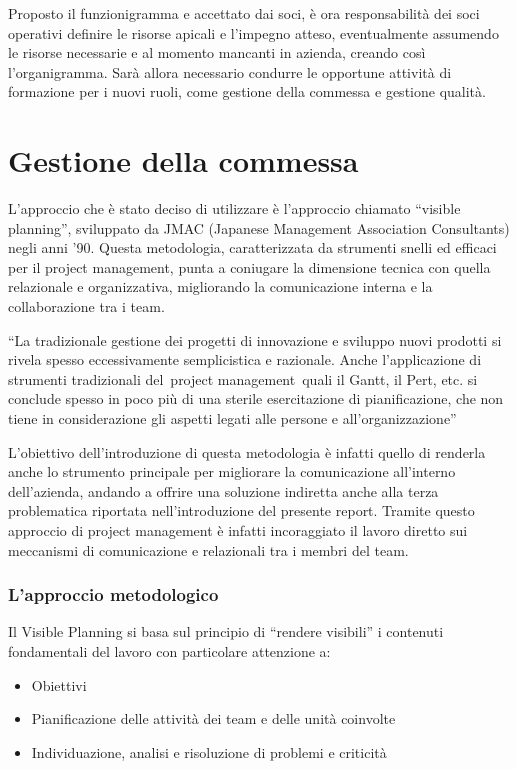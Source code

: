 \begin{multicols}{2}
	Proposto il funzionigramma e accettato dai soci, è ora responsabilità dei soci operativi definire le risorse apicali e l’impegno atteso, eventualmente assumendo le risorse necessarie e al momento mancanti in azienda, creando così l’organigramma. Sarà allora necessario condurre le opportune attività di formazione per i nuovi ruoli, come gestione della commessa e gestione qualità.
\end{multicols}

\section{Gestione della commessa}
\begin{multicols}{2}
	L’approccio che è stato deciso di utilizzare è l’approccio chiamato “visible planning”, sviluppato da JMAC (Japanese Management Association Consultants) negli anni '90. Questa metodologia, caratterizzata da strumenti snelli ed efficaci per il project management, punta a coniugare la dimensione tecnica con quella relazionale e organizzativa, migliorando la comunicazione interna e la collaborazione tra i team.

	“La tradizionale gestione dei progetti di innovazione e sviluppo nuovi prodotti si rivela spesso eccessivamente semplicistica e razionale. Anche l’applicazione di strumenti tradizionali del project management quali il Gantt, il Pert, etc. si conclude spesso in poco più di una sterile esercitazione di pianificazione, che non tiene in considerazione gli aspetti legati alle persone e all’organizzazione”

	L’obiettivo dell’introduzione di questa metodologia è infatti quello di renderla anche lo strumento principale per migliorare la comunicazione all’interno dell’azienda, andando a offrire una soluzione indiretta anche alla terza problematica riportata nell’introduzione del presente report. Tramite questo approccio di project management è infatti incoraggiato il lavoro diretto sui meccanismi di comunicazione e relazionali tra i membri del team.

	\subsubsection{L'approccio metodologico}
	Il Visible Planning si basa sul principio di “rendere visibili” i contenuti fondamentali del lavoro con particolare attenzione a:

	\begin{itemize}
		\item Obiettivi
		\item	Pianificazione delle attività dei team e delle unità coinvolte
		\item Individuazione, analisi e risoluzione di problemi e criticità
	\end{itemize}


\end{multicols}
